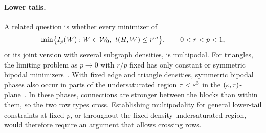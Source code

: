 \paragraph{Lower tails.}  A related question is whether every minimizer of
\[
  \min\bigl\{I_p(W):W\in\mathcal W_0,\ t(H,W)\le r^m\bigr\},
  \qquad 0<r<p<1,
\]
or its joint version with several subgraph densities, is multipodal.
For triangles, the limiting problem as $p\to0$ with $r/p$ fixed has only
constant or symmetric bipodal minimizers~\cite{HuangLi2026LowerTail}.
With fixed edge and triangle densities, symmetric bipodal phases also
occur in parts of the undersaturated region $\tau<\varepsilon^3$ in the
$(\varepsilon,\tau)$-plane~\cite{NeemanRadinSadun2024}.
In these phases, connections are stronger between the blocks than within
them, so the two row types cross. Establishing multipodality for general
lower-tail constraints at fixed $p$, or throughout the fixed-density
undersaturated region, would therefore require an argument that allows
crossing rows.
